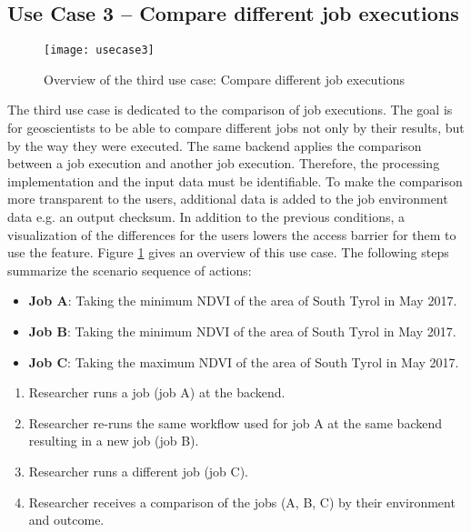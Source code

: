 \documentclass[draft,final]{vutinfth} %
\begin{document}
\subsection{Use Case 3 – Compare different job executions}\label{UseCase3}
\begin{figure}[h]
	\centering
	\texttt{[image: usecase3]}
	\caption{Overview of the third use case: Compare different job executions}
	\label{fig:usecase3} %
\end{figure}
The third use case is dedicated to the comparison of job executions. The goal is for geoscientists to be able to compare different jobs not only by their results, but by the way they were executed. The same backend applies the comparison between a job execution and another job execution. Therefore, the processing implementation and the input data must be identifiable. To make the comparison more transparent to the users, additional data is added to the job environment data e.g. an output checksum. In addition to the previous conditions, a visualization of the differences for the users lowers the access barrier for them to use the feature. Figure \ref{fig:usecase3} gives an overview of this use case.
The following steps summarize the scenario sequence of actions: \\

\begin{itemize}
	\item \textbf{Job A}: Taking the minimum NDVI of the area of South Tyrol in May 2017. 
	\item \textbf{Job B}: Taking the minimum NDVI of the area of South Tyrol in May 2017.
	\item \textbf{Job C}: Taking the maximum NDVI of the area of South Tyrol in May 2017.
\end{itemize}

\begin{enumerate}
	\item Researcher runs a job (job A) at the backend.
	\item Researcher re-runs the same workflow used for job A at the same backend resulting in a new job (job B).
	\item Researcher runs a different job (job C).   
	\item Researcher receives a comparison of the jobs (A, B, C) by their environment and outcome.
\end{enumerate}
\end{document}
